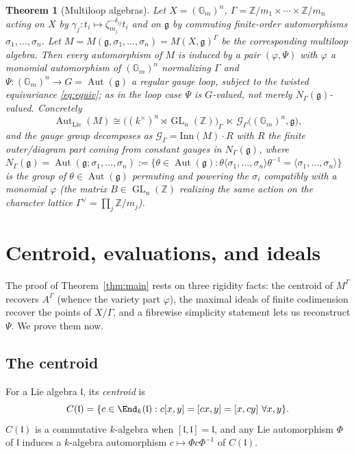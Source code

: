 \documentclass{amsart}
\newtheorem{theorem}{Theorem}
\theoremstyle{definition}
\DeclareMathOperator{\Aut}{Aut}
\DeclareMathOperator{\GL}{GL}
\newcommand{\Gm}{\mathbb{G}_m}
\newcommand{\g}{\mathfrak{g}}
\newcommand{\Z}{\mathbb{Z}}
\newcommand{\M}{M}
\begin{document}
\begin{theorem}[Multiloop algebras]\label{thm:multiloop}
Let $X=(\Gm)^n$, $\Gamma=\Z/m_1\times\cdots\times\Z/m_n$ acting on $X$ by
$\gamma_j\colon t_i\mapsto \zeta_{m_j}^{-\delta_{ij}}t_i$ and on $\g$ by
commuting finite-order automorphisms $\sigma_1,\dots,\sigma_n$.  Let
$M=M(\g,\sigma_1,\dots,\sigma_n)=\M(X,\g)^\Gamma$ be the corresponding
multiloop algebra.  Then every automorphism of $M$ is induced by a pair
$(\varphi,\Psi)$ with $\varphi$ a monomial automorphism of $(\Gm)^n$
normalizing $\Gamma$ and $\Psi\colon(\Gm)^n\to G=\Aut(\g)$ a regular gauge
loop, subject to the twisted equivariance \eqref{eq:equiv}; as in the loop
case $\Psi$ is $G$-valued, not merely $N_\Gamma(\g)$-valued.  Concretely
\[
\Aut_{\mathrm{Lie}}(M)\cong
\bigl((k^\times)^n\rtimes\GL_n(\Z)\bigr)_\Gamma
\ \ltimes\ \mathcal G_\Gamma\bigl((\Gm)^n,\g\bigr),
\]
and the gauge group decomposes as $\mathcal G_\Gamma=\mathrm{Inn}(M)\cdot R$
with $R$ the finite outer/diagram part coming from constant gauges in
$N_\Gamma(\g)$, where
$N_\Gamma(\g)=\Aut(\g;\sigma_1,\dots,\sigma_n):=\{\theta\in\Aut(\g):
\theta\langle\sigma_1,\dots,\sigma_n\rangle\theta^{-1}=
\langle\sigma_1,\dots,\sigma_n\rangle\}$ is the group of $\theta\in\Aut(\g)$
permuting and powering the $\sigma_i$ compatibly with a monomial $\varphi$
(the matrix $B\in\GL_n(\Z)$ realizing the same action on the character
lattice $\Gamma^\vee=\prod_j\Z/m_j$).
\end{theorem}

\section{Centroid, evaluations, and ideals}\label{sec:central}

The proof of Theorem~\ref{thm:main} rests on three rigidity facts:
the centroid of $\M^\Gamma$ recovers $A^\Gamma$ (whence the variety part
$\varphi$), the maximal ideals of finite codimension recover the points of
$X/\Gamma$, and a fibrewise simplicity statement lets us reconstruct
$\Psi$.  We prove them now.

\subsection{The centroid}
For a Lie algebra $\mathfrak l$, its \emph{centroid} is
\[
C(\mathfrak l)=\{c\in\End_k(\mathfrak l):
c[x,y]=[cx,y]=[x,cy]\ \forall x,y\}.
\]
$C(\mathfrak l)$ is a commutative $k$-algebra when $[\mathfrak l,\mathfrak
l]=\mathfrak l$, and any Lie automorphism $\Phi$ of $\mathfrak l$ induces a
$k$-algebra automorphism $c\mapsto\Phi c\Phi^{-1}$ of $C(\mathfrak l)$.
\end{document}
